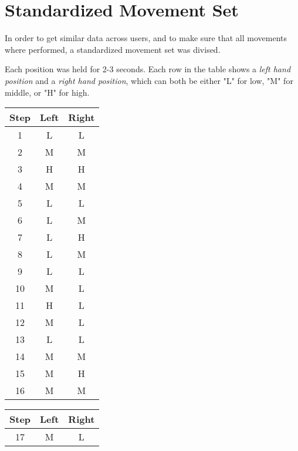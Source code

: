 \chapter{Standardized Movement Set}
\label{appendix: standardized movement set}

In order to get similar data across users, and to make sure that all movements where performed, a standardized movement set was divised.

Each position was held for 2-3 seconds. 
Each row in the table shows a \textit{left hand position} and a \textit{right hand position}, which can both be either "L" for low, "M" for middle, or "H" for high.


\begin{table}[h]
    \centering
    \begin{subtable}[t]{0.3\textwidth}
    \centering
    \begin{tabular}[t]{||c|c|c||}
    \hline
    Step & Left & Right\\
    \hline \hline
      1 & L  & L\\
      \hline
      2 & M  &M\\
      \hline
      3 & H & H\\ 
      \hline
      4 & M & M\\ 
      \hline
      5 & L & L\\ 
      \hline
      6 & L & M\\ 
      \hline
      7 & L & H\\ 
      \hline
      8 & L & M\\ 
      \hline
      9 & L & L\\ 
      \hline
      10 & M & L\\
      \hline
      11 & H & L \\
      \hline
      12 & M & L \\
      \hline
      13 & L & L \\
      \hline
      14 & M & M \\
      \hline
      15 & M & H \\
      \hline
      16 & M & M \\
      \hline
    \end{tabular}
    \end{subtable}
    \begin{subtable}[t]{0.3\textwidth}
    \centering
    \begin{tabular}[t]{||c|c|c||}
    \hline
    Step & Left & Right\\
    \hline \hline
      17 & M & L \\

\end{tabular}
\end{subtable}
\end{table}
